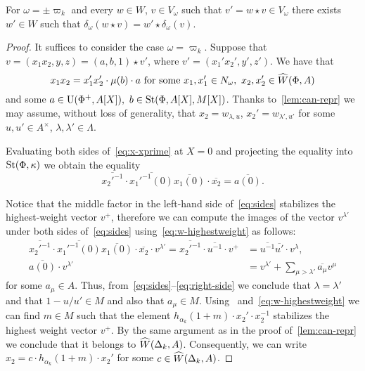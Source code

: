 \begin{prop} \label{prop:v-correctness2}
 For $\omega = \pm \varpi_k$ and every $w \in W$, $v \in V_\omega$ such that $v' = w \star v \in V_\omega$ there exists $w' \in W$ such that
  $\delta_\omega(w \star v) = w' \star \delta_\omega(v)$.
\end{prop}
\begin{proof}
 It suffices to consider the case $\omega = \varpi_k$.
 Suppose that $v = (x_1 x_2, y, z) = (a, b, 1) \star v'$, where $v' = (x_1' x_2', y', z')$.
 We have that
 \begin{equation}\label{eq:x-xprime} x_1 x_2 = x_1' x_2' \cdot \mu(b) \cdot a  \text{ for some }x_1, x_1' \in N_\omega,\ x_2, x_2' \in \widehat{W}(\Phi, A) \end{equation}
 and some $a \in \operatorname{U}(\Phi^+, A[X]),\ b \in \operatorname{St}(\Phi, A[X], M[X])$.
 Thanks to~\cref{lem:can-repr} we may assume, without loss of generality, that $x_2 = w_{\lambda, u}$, $x_2' = w_{\lambda', u'}$
 for some $u, u' \in A^\times$, $\lambda, \lambda' \in \Lambda$.

 Evaluating both sides of~\eqref{eq:x-xprime} at $X=0$ and projecting the equality into $\operatorname{St}(\Phi, \kappa)$ we obtain the equality
 \begin{equation} \label{eq:sides}
 \overline{{x_2'}^{-1}} \cdot \overline{{x_1'}^{-1}(0)} \overline{x_1(0)} \cdot \overline{x_2} = \overline{a(0)}.
 \end{equation}

 Notice that the middle factor in the left-hand side of~\eqref{eq:sides} stabilizes the highest-weight vector $v^+$,
 therefore we can compute the images of the vector $v^{\lambda'}$ under both sides of~\eqref{eq:sides} using~\eqref{eq:w-highestweight} as follows:
 \begin{align} \overline{{x_2'}^{-1}} \cdot \overline{{x_1'}^{-1}(0)} \overline{x_1(0)} \cdot \overline{x_2} \cdot v^{\lambda'} = \overline{{x_2'}^{-1}} \cdot \overline{{u}^{-1}} \cdot v^+ &= \overline{u^{-1}}\overline{u'} \cdot v^\lambda, \\
               \overline{a(0)} \cdot v^{\lambda'} &= v^{\lambda'} + \sum_{\mu > \lambda'} \overline{a_\mu} v^\mu \label{eq:right-side} \end{align}
 for some $a_\mu \in A$.
 Thus, from~\eqref{eq:sides}--\eqref{eq:right-side} we conclude that $\lambda = \lambda'$ and that $1 - u/u' \in M$ and also that $a_\mu \in M$.
 Using~\cite[Lemma~7]{V00} and~\eqref{eq:w-highestweight} we can find $m \in M$ such that the element
  $h_{\alpha_k}(1+m) \cdot x_2' \cdot x_2^{-1}$ stabilizes the highest weight vector $v^+$.
 By the same argument as in the proof of~\cref{lem:can-repr} we conclude that it belongs to $\widehat{W}(\Delta_k, A)$.
 Consequently, we can write $x_2 = c \cdot h_{\alpha_k}(1+m) \cdot x_2'$ for some $c \in \widehat{W}(\Delta_k, A)$.


\end{proof}
